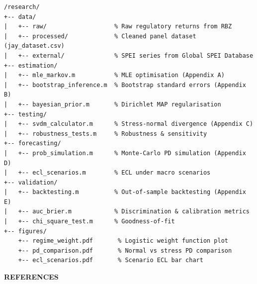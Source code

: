 \documentclass[12pt,a4paper]{article}
\begin{document}
\begin{verbatim}
/research/
+-- data/
|   +-- raw/                   % Raw regulatory returns from RBZ
|   +-- processed/             % Cleaned panel dataset (jay_dataset.csv)
|   +-- external/              % SPEI series from Global SPEI Database
+-- estimation/
|   +-- mle_markov.m           % MLE optimisation (Appendix A)
|   +-- bootstrap_inference.m  % Bootstrap standard errors (Appendix B)
|   +-- bayesian_prior.m       % Dirichlet MAP regularisation
+-- testing/
|   +-- svdm_calculator.m      % Stress-normal divergence (Appendix C)
|   +-- robustness_tests.m     % Robustness & sensitivity
+-- forecasting/
|   +-- prob_simulation.m      % Monte-Carlo PD simulation (Appendix D)
|   +-- ecl_scenarios.m        % ECL under macro scenarios
+-- validation/
|   +-- backtesting.m          % Out-of-sample backtesting (Appendix E)
|   +-- auc_brier.m            % Discrimination & calibration metrics
|   +-- chi_square_test.m      % Goodness-of-fit
+-- figures/
    +-- regime_weight.pdf       % Logistic weight function plot
    +-- pd_comparison.pdf       % Normal vs stress PD comparison
    +-- ecl_scenarios.pdf       % Scenario ECL bar chart
\end{verbatim}

\newpage

\begin{center}
    {\LARGE\bfseries REFERENCES}
\end{center}

\vspace{0.5cm}
\end{document}
